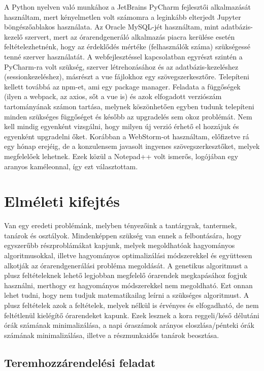 \documentclass[12pt,a4paper]{report}
\begin{document}
A Python nyelven való munkához a JetBrains PyCharm fejlesztői alkalmazását használtam, mert kényelmetlen volt számomra a leginkább elterjedt Jupyter böngészőablakos használata. Az Oracle MySQL-jét használtam, mint adatbázis-kezelő szervert, mert az órarendgeneráló alkalmazás piacra kerülése esetén feltételezhetnénk, hogy az érdeklődés mértéke (felhasználók száma) szükségessé tenné szerver használatát. A webfejlesztéssel kapcsolatban egyrészt szintén a PyCharm-ra volt szükség, szerver létrehozásához és az adatbázis-kezeléshez (sessionkezeléshez), másrészt a vue fájlokhoz egy szövegszerkesztőre. Telepíteni kellett továbbá az npm-et, ami egy package manager. Feladata a függőségek (ilyen a webpack, az axios, sőt a vue is) és azok elfogadott verziószám tartományának számon tartása, melynek köszönhetően egyben tudunk telepíteni minden szükséges függőséget és később az upgradelés sem okoz problémát. Nem kell mindig egyenként vizsgálni, hogy milyen új verzió érhető el hozzájuk és egyenként upgradelni őket. Korábban a WebStorm-ot használtam, előfizetve rá egy hónap erejéig, de a konzulensem javasolt ingyenes szövegszerkesztőket, melyek megfelelőek lehetnek. Ezek közül a Notepad++ volt ismerős, logójában egy aranyos kaméleonnal, így ezt választottam.

\newpage

\section{Elméleti kifejtés}

Van egy eredeti problémánk, melyben tényezőink a tantárgyak, tantermek, tanárok és 
osztályok. Mindenképpen szükség van ennek a felbontására, hogy egyszerűbb részproblámákat kapjunk, melyek megoldhatóak hagyományos algoritmusokkal, illetve hagyományos optimalizálási módszerekkel és együttesen alkotják az órarendgenerálási probléma megoldását. A genetikus algoritmust a plusz feltételeknek lehető legjobban megfelelő órarendek megkapásához fogjuk használni, merthogy ez hagyományos módszerekkel nem megoldható. Ezt onnan lehet tudni, hogy nem tudjuk matematikailag leírni a szükséges algoritmust. A plusz feltételek azok a feltételek, melyek nélkül is érvényes és elfogadható, de nem feltétlenül kielégítő órarendeket kapunk. Ezek lesznek a kora reggeli/késő délutáni órák számának minimalizálása, a napi óraszámok arányos eloszlása/pénteki órák számának minimalizálása, illetve a részmunkaidős tanárok beosztása.

\subsection{Teremhozzárendelési feladat}
\end{document}
